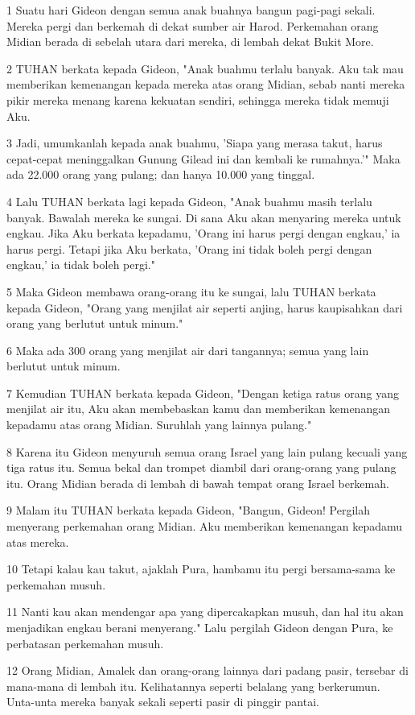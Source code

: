 \par 1 Suatu hari Gideon dengan semua anak buahnya bangun pagi-pagi sekali. Mereka pergi dan berkemah di dekat sumber air Harod. Perkemahan orang Midian berada di sebelah utara dari mereka, di lembah dekat Bukit More.
\par 2 TUHAN berkata kepada Gideon, "Anak buahmu terlalu banyak. Aku tak mau memberikan kemenangan kepada mereka atas orang Midian, sebab nanti mereka pikir mereka menang karena kekuatan sendiri, sehingga mereka tidak memuji Aku.
\par 3 Jadi, umumkanlah kepada anak buahmu, 'Siapa yang merasa takut, harus cepat-cepat meninggalkan Gunung Gilead ini dan kembali ke rumahnya.'" Maka ada 22.000 orang yang pulang; dan hanya 10.000 yang tinggal.
\par 4 Lalu TUHAN berkata lagi kepada Gideon, "Anak buahmu masih terlalu banyak. Bawalah mereka ke sungai. Di sana Aku akan menyaring mereka untuk engkau. Jika Aku berkata kepadamu, 'Orang ini harus pergi dengan engkau,' ia harus pergi. Tetapi jika Aku berkata, 'Orang ini tidak boleh pergi dengan engkau,' ia tidak boleh pergi."
\par 5 Maka Gideon membawa orang-orang itu ke sungai, lalu TUHAN berkata kepada Gideon, "Orang yang menjilat air seperti anjing, harus kaupisahkan dari orang yang berlutut untuk minum."
\par 6 Maka ada 300 orang yang menjilat air dari tangannya; semua yang lain berlutut untuk minum.
\par 7 Kemudian TUHAN berkata kepada Gideon, "Dengan ketiga ratus orang yang menjilat air itu, Aku akan membebaskan kamu dan memberikan kemenangan kepadamu atas orang Midian. Suruhlah yang lainnya pulang."
\par 8 Karena itu Gideon menyuruh semua orang Israel yang lain pulang kecuali yang tiga ratus itu. Semua bekal dan trompet diambil dari orang-orang yang pulang itu. Orang Midian berada di lembah di bawah tempat orang Israel berkemah.
\par 9 Malam itu TUHAN berkata kepada Gideon, "Bangun, Gideon! Pergilah menyerang perkemahan orang Midian. Aku memberikan kemenangan kepadamu atas mereka.
\par 10 Tetapi kalau kau takut, ajaklah Pura, hambamu itu pergi bersama-sama ke perkemahan musuh.
\par 11 Nanti kau akan mendengar apa yang dipercakapkan musuh, dan hal itu akan menjadikan engkau berani menyerang." Lalu pergilah Gideon dengan Pura, ke perbatasan perkemahan musuh.
\par 12 Orang Midian, Amalek dan orang-orang lainnya dari padang pasir, tersebar di mana-mana di lembah itu. Kelihatannya seperti belalang yang berkerumun. Unta-unta mereka banyak sekali seperti pasir di pinggir pantai.
